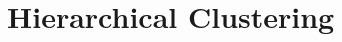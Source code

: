 \documentclass[aspectratio=169,usenames,dvipsnames]{beamer}
\newcommand{\InstructorList}[1]{
\begin{itemize}
	\color{orange}
	#1
\end{itemize}
}
\begin{document}











\section{Hierarchical Clustering}
\end{document}
